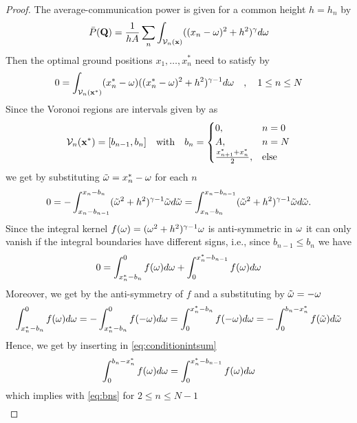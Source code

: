 \documentclass[smallabstract,smallcaptions]{dccpaper}
\newcommand{\Pbar}{\ensuremath{\bar{P}}}         %
\newcommand{\Vor}{\ensuremath{\mathcal{V}}}         %
\begin{document}
\begin{proof}
  The average-communication power is given for a common height $h=h_n$ by
  \begin{align}
    \Pbar(\vQ)= \frac{1}{hA} \sum_n \int_{\Vor_n(\vx)} ((x_n-\ome)^2+h^2)^{\gam}d\ome\label{eq:comonheightobj}
  \end{align}
%
Then the optimal ground positions $x_1,\dots,x_n^*$ need to satisfy by 
%
\begin{align}
  0 = \int_{\Vor_n(\vx^*)} (x_n^*-\ome) ((x_n^*-\ome)^2+h^2)^{\gam-1}d\ome \quad,\quad 1\leq n\leq N\label{eq:vornx}
\end{align}
%
Since the Voronoi regions are intervals given by   as
%
\begin{align}
  \Vor_n(\vx^*) = [b_{n-1},b_n] \quad\text{with}\quad b_n= \begin{cases} 0, &n=0\\
    A, &n=N\\
    \frac{x^*_{n+1}+x^*_{n}}{2}, &\text{else}
  \end{cases}\label{eq:bns}
\end{align}
%
we get by substituting ${  \tilde{\omega} }=x_n^*-\omega$ for each $n$ 
%
\begin{align}
  0=-\int_{x_n-b_{n-1}}^{x_n-b_{n}} ({  \tilde{\omega} }^2+h^2)^{\gamma-1}{  \tilde{\omega} } d{  \tilde{\omega} } 
  =\int_{x_n-b_{n}}^{x_n-b_{n-1}} ({  \tilde{\omega} }^2+h^2)^{\gamma-1}{  \tilde{\omega} } d{  \tilde{\omega} }.
\end{align}
%
Since the integral kernel $f(\omega)=(\omega^2+h^2)^{\gamma-1}\omega$ is anti-symmetric in $\omega$ it can only
vanish if the integral boundaries have different signs, i.e., since $b_{n-1}\leq b_n$ we have
%
\begin{align}
  0= \int_{x_n^*-b_{n}}^0 f(\omega)d\omega + \int_0^{x_n^*-b_{n-1}} f(\omega)d\omega \label{eq:conditionintsum}
\end{align}
%
Moreover, we get by the anti-symmetry of $f$ and a substituting by ${  \tilde{\omega} }=-\omega$
%
\begin{align}
  \int_{x_n^*-b_{n}}^0 f(\omega)d\omega =-\int_{x_n^*-b_{n}}^0f(-\omega)d\omega =\int_0^{x_n^*-b_{n}}f(-\omega)d\omega =
  -\int_{0}^{b_{n}-x_n^*} f({  \tilde{\omega} })d{  \tilde{\omega} } 
\end{align}
%
Hence, we get by inserting in \eqref{eq:conditionintsum}
%
\begin{align}
  \int_0^{b_n-x_n^*} f(\omega)d\omega = \int_0^{x_n^*-b_{n-1}}f(\omega)d\omega 
\end{align}
%
which implies with \eqref{eq:bns} for $2\leq n\leq N-1$ 
%
\begin{align}

\end{align}
\end{proof}
\end{document}
